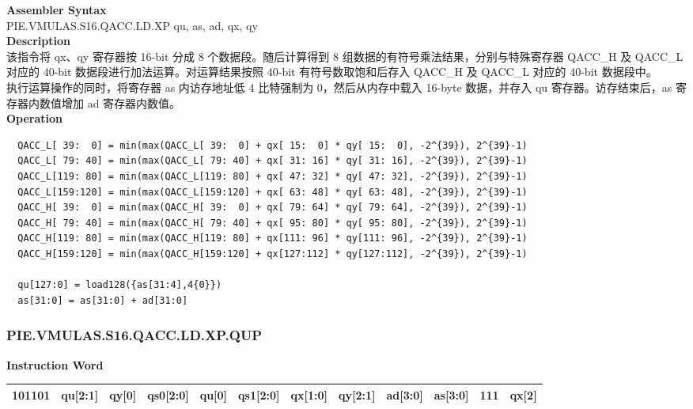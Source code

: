 \textbf{Assembler Syntax} \\
PIE.VMULAS.S16.QACC.LD.XP qu, as, ad, qx, qy \\
\textbf{Description} \\
该指令将 qx、qy 寄存器按 16-bit 分成 8 个数据段。随后计算得到 8 组数据的有符号乘法结果，分别与特殊寄存器 QACC\_H 及 QACC\_L 对应的 40-bit 数据段进行加法运算。对运算结果按照 40-bit 有符号数取饱和后存入 QACC\_H 及 QACC\_L 对应的 40-bit 数据段中。\\
执行运算操作的同时，将寄存器 as 内访存地址低 4 比特强制为 0，然后从内存中载入 16-byte 数据，并存入 qu 寄存器。访存结束后，as 寄存器内数值增加 ad 寄存器内数值。\\
\textbf{Operation}
\begin{lstlisting}
  QACC_L[ 39:  0] = min(max(QACC_L[ 39:  0] + qx[ 15:  0] * qy[ 15:  0], -2^{39}), 2^{39}-1)
  QACC_L[ 79: 40] = min(max(QACC_L[ 79: 40] + qx[ 31: 16] * qy[ 31: 16], -2^{39}), 2^{39}-1)
  QACC_L[119: 80] = min(max(QACC_L[119: 80] + qx[ 47: 32] * qy[ 47: 32], -2^{39}), 2^{39}-1)
  QACC_L[159:120] = min(max(QACC_L[159:120] + qx[ 63: 48] * qy[ 63: 48], -2^{39}), 2^{39}-1)
  QACC_H[ 39:  0] = min(max(QACC_H[ 39:  0] + qx[ 79: 64] * qy[ 79: 64], -2^{39}), 2^{39}-1)
  QACC_H[ 79: 40] = min(max(QACC_H[ 79: 40] + qx[ 95: 80] * qy[ 95: 80], -2^{39}), 2^{39}-1)
  QACC_H[119: 80] = min(max(QACC_H[119: 80] + qx[111: 96] * qy[111: 96], -2^{39}), 2^{39}-1)
  QACC_H[159:120] = min(max(QACC_H[159:120] + qx[127:112] * qy[127:112], -2^{39}), 2^{39}-1)

  qu[127:0] = load128({as[31:4],4{0}})
  as[31:0] = as[31:0] + ad[31:0]
\end{lstlisting}

\newpage
\subsubsection{PIE.VMULAS.S16.QACC.LD.XP.QUP}\label{instruction:PIEVMULASS16QACCLDXPQUP}
\setlength\tabcolsep{6pt}
\textbf{Instruction Word} \\
\begin{tabular}{|c|c|c|c|c|c|c|c|c|c|c|c|}
	\hline
	101101 & qu[2:1] & qy[0] & qs0[2:0] & qu[0] & qs1[2:0] & qx[1:0] & qy[2:1] & ad[3:0] & as[3:0] & 111 & qx[2] \\
	\hline
\end{tabular}

